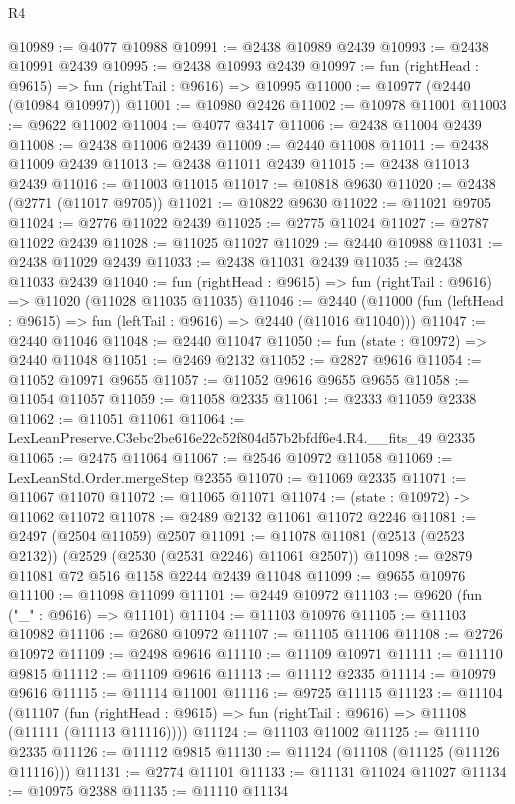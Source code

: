 \begin{lexlean}{R4}
\begin{coremodule}
@10989 := @4077 @10988
@10991 := @2438 @10989 @2439
@10993 := @2438 @10991 @2439
@10995 := @2438 @10993 @2439
@10997 := fun (rightHead : @9615) => fun (rightTail : @9616) => @10995
@11000 := @10977 (@2440 (@10984 @10997))
@11001 := @10980 @2426
@11002 := @10978 @11001
@11003 := @9622 @11002
@11004 := @4077 @3417
@11006 := @2438 @11004 @2439
@11008 := @2438 @11006 @2439
@11009 := @2440 @11008
@11011 := @2438 @11009 @2439
@11013 := @2438 @11011 @2439
@11015 := @2438 @11013 @2439
@11016 := @11003 @11015
@11017 := @10818 @9630
@11020 := @2438 (@2771 (@11017 @9705))
@11021 := @10822 @9630
@11022 := @11021 @9705
@11024 := @2776 @11022 @2439
@11025 := @2775 @11024
@11027 := @2787 @11022 @2439
@11028 := @11025 @11027
@11029 := @2440 @10988
@11031 := @2438 @11029 @2439
@11033 := @2438 @11031 @2439
@11035 := @2438 @11033 @2439
@11040 := fun (rightHead : @9615) => fun (rightTail : @9616) => @11020 (@11028 @11035 @11035)
@11046 := @2440 (@11000 (fun (leftHead : @9615) => fun (leftTail : @9616) => @2440 (@11016 @11040)))
@11047 := @2440 @11046
@11048 := @2440 @11047
@11050 := fun (state : @10972) => @2440 @11048
@11051 := @2469 @2132
@11052 := @2827 @9616
@11054 := @11052 @10971 @9655
@11057 := @11052 @9616 @9655 @9655
@11058 := @11054 @11057
@11059 := @11058 @2335
@11061 := @2333 @11059 @2338
@11062 := @11051 @11061
@11064 := LexLeanPreserve.C3ebc2be616e22c52f804d57b2bfdf6e4.R4.__fits_49 @2335
@11065 := @2475 @11064
@11067 := @2546 @10972 @11058
@11069 := LexLeanStd.Order.mergeStep @2355
@11070 := @11069 @2335
@11071 := @11067 @11070
@11072 := @11065 @11071
@11074 := (state : @10972) -> @11062 @11072
@11078 := @2489 @2132 @11061 @11072 @2246
@11081 := @2497 (@2504 @11059) @2507
@11091 := @11078 @11081 (@2513 (@2523 @2132)) (@2529 (@2530 (@2531 @2246) @11061 @2507))
@11098 := @2879 @11081 @72 @516 @1158 @2244 @2439 @11048
@11099 := @9655 @10976
@11100 := @11098 @11099
@11101 := @2449 @10972
@11103 := @9620 (fun ("_" : @9616) => @11101)
@11104 := @11103 @10976
@11105 := @11103 @10982
@11106 := @2680 @10972
@11107 := @11105 @11106
@11108 := @2726 @10972
@11109 := @2498 @9616
@11110 := @11109 @10971
@11111 := @11110 @9815
@11112 := @11109 @9616
@11113 := @11112 @2335
@11114 := @10979 @9616
@11115 := @11114 @11001
@11116 := @9725 @11115
@11123 := @11104
    (@11107 (fun (rightHead : @9615) => fun (rightTail : @9616) => @11108 (@11111 (@11113 @11116))))
@11124 := @11103 @11002
@11125 := @11110 @2335
@11126 := @11112 @9815
@11130 := @11124 (@11108 (@11125 (@11126 @11116)))
@11131 := @2774 @11101
@11133 := @11131 @11024 @11027
@11134 := @10975 @2388
@11135 := @11110 @11134

\end{coremodule}
\end{lexlean}
